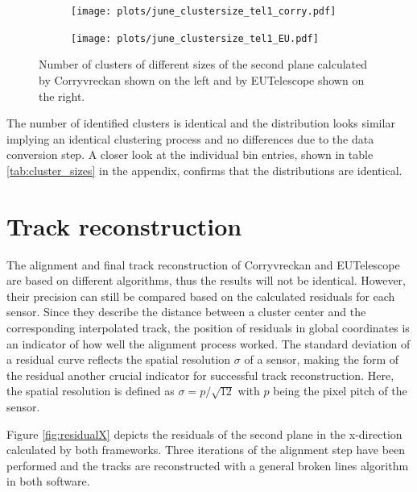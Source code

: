 \begin{figure}
  \hspace{-1cm}
  \begin{subfigure}{0.53\textwidth}
      \texttt{[image: plots/june\_clustersize\_tel1\_corry.pdf]}
  \end{subfigure}
  \begin{subfigure}{0.53\textwidth}
      \texttt{[image: plots/june\_clustersize\_tel1\_EU.pdf]}
  \end{subfigure}
  \caption{Number of clusters of different sizes of the second plane calculated by Corryvreckan shown on the left and by EUTelescope shown on the right.}
  \label{fig:cluster_size}
\end{figure}

The number of identified clusters is identical and the distribution looks similar implying an identical clustering process
and no differences due to the data conversion step. A closer look at the individual bin entries, shown in table \ref{tab:cluster_sizes} in the appendix,
confirms that the distributions are identical.

\section{Track reconstruction}
The alignment and final track reconstruction of Corryvreckan and EUTelescope are based on different algorithms, thus the
results will not be identical. However, their precision can still be compared based on the calculated residuals for each sensor.
Since they describe the distance between a cluster center and the corresponding interpolated track, the position of
residuals in global coordinates is an indicator of how well the alignment process worked. The standard deviation of a
residual curve reflects the spatial resolution $\sigma$ of a sensor, making the form of the residual another crucial indicator
for successful track reconstruction. Here, the spatial resolution is defined as ${\sigma = p/\sqrt{12}}$ with $p$ being the
pixel pitch of the sensor.

Figure \ref{fig:residualX} depicts the residuals of the second plane in the x-direction calculated by both frameworks. Three iterations
of the alignment step have been performed and the tracks are reconstructed with a general broken lines algorithm in both software.

